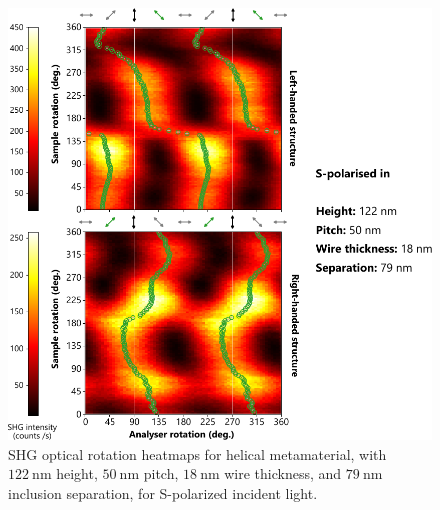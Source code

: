 \begin{figure}[htb!]	
    \centering	
    \includegraphics[scale=1]{./figures/results/OAinPlanarNanohelices/8_s_data.pdf}
    \caption{\label{fig:results:OAinPlanarNanohelices:8_s_data}
    SHG optical rotation heatmaps for helical metamaterial, with $\SI{122}{\nano\m}$ height, $\SI{50}{\nano\m}$ pitch, $\SI{18}{\nano\m}$ wire thickness, and $\SI{79}{\nano\m}$ inclusion separation, for S-polarized incident light.}	
\end{figure}

